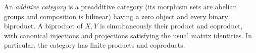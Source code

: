 
An \emph{additive category} is a preadditive category (its morphism sets are abelian groups and composition is bilinear) having a zero object and every binary biproduct. A biproduct of $X,Y$ is simultaneously their product and coproduct, with canonical injections and projections satisfying the usual matrix identities. In particular, the category has finite products and coproducts.
